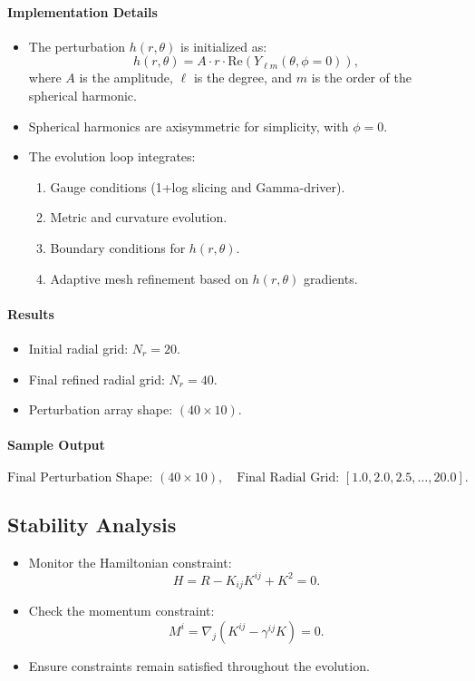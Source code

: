 \documentclass[12pt]{article}
\begin{document}
\paragraph{Implementation Details}
\begin{itemize}
    \item The perturbation $h(r, \theta)$ is initialized as:
    \[
    h(r, \theta) = A \cdot r \cdot \text{Re}(Y_{\ell m}(\theta, \phi=0)),
    \]
    where $A$ is the amplitude, $\ell$ is the degree, and $m$ is the order of the spherical harmonic.
    \item Spherical harmonics are axisymmetric for simplicity, with $\phi=0$.
    \item The evolution loop integrates:
    \begin{enumerate}
        \item Gauge conditions (1+log slicing and Gamma-driver).
        \item Metric and curvature evolution.
        \item Boundary conditions for $h(r, \theta)$.
        \item Adaptive mesh refinement based on $h(r, \theta)$ gradients.
    \end{enumerate}
\end{itemize}

\paragraph{Results}
\begin{itemize}
    \item Initial radial grid: $N_r = 20$.
    \item Final refined radial grid: $N_r = 40$.
    \item Perturbation array shape: $(40 \times 10)$.
\end{itemize}

\paragraph{Sample Output}
\[
\text{Final Perturbation Shape: } (40 \times 10), \quad \text{Final Radial Grid: } [1.0, 2.0, 2.5, \dots, 20.0].
\]


\subsection{Stability Analysis}
\begin{itemize}
    \item Monitor the Hamiltonian constraint:
    \[
    H = R - K_{ij}K^{ij} + K^2 = 0.
    \]
    \item Check the momentum constraint:
    \[
    M^i = \nabla_j \left(K^{ij} - \gamma^{ij}K\right) = 0.
    \]
    \item Ensure constraints remain satisfied throughout the evolution.
\end{itemize}
\end{document}
